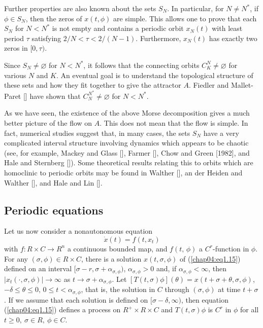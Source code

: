 \documentclass{surv-l}
\theoremstyle{plain}
\theoremstyle{definition}
\numberwithin{equation}{section}
\numberwithin{figure}{chapter}
\begin{document}
Further properties are also known about the sets $S_{N}$. In particular, for $ N\neq N^{\ast}$, if $\phi \in S_{N}$, then the zeros of $x(t, \phi)$ are simple. This allows one to prove that each $S_{N}$ for $N<N^{\ast}$ is not empty and contains a periodic orbit $x_{N}(t)$ with least period $\tau$ satisfying $2/N<\tau<2/(N-1)$. Furthermore, $x_{N}(t)$ has exactly two zeros in $[0, \tau)$.

Since $ S_{N}\neq\varnothing$ for $N<N^{\ast}$, it follows that the connecting orbits $ C_{K}^{N}\neq\varnothing$ for various $N$ and $K$. An eventual goal is to understand the topological structure of these sets and how they fit together to give the attractor $A$. Fiedler and Mallet-Paret [\citeyear{1987fm}] have shown that $ C_{N}^{N^{\ast}}\neq\varnothing$ for $N<{N^{\ast}}$.

As we have seen, the existence of the above Morse decomposition gives a much better picture of the flow on $A$. This does not mean that the flow is simple. In fact, numerical studies suggest that, in many cases, the sets $S_{N}$ have a very complicated interval structure involving dynamics which appears to be chaotic (see, for example, Mackey and Glass [\citeyear{1977mg}], Farmer [\citeyear{1982f}], Chow and Green [1982], and Hale and Sternberg [\citeyear{1987hs}]). Some theoretical results relating this to orbits which are homoclinic to periodic orbits may be found in Walther [\citeyear{1981w}], an der Heiden and Walther [\citeyear{1983dw}], and Hale and Lin [\citeyear{1986hl}].

\subsection{Periodic equations}\label{subsec4.1.6} Let us now consider a nonautonomous equation
\begin{equation}\label{chap04:eq1.15}
\dot{x}(t)=f(t, x_{t})
\end{equation}
with $f\!:R\times C\rightarrow R^{n}$ a continuous bounded map, and $f(t,\,\phi)$ a $C^{r}$-function in $\phi$. For any $(\sigma, \phi)\in R\times C$, there is a solution $x(t, \sigma, \phi)$ of (\ref{chap04:eq1.15}) defined on an interval $[\sigma-r, \sigma+\alpha_{\sigma,\phi})$, $\alpha_{\sigma,\phi}>0$ and, if $\alpha_{\sigma,\phi}<\infty$, then $|x_{t}(\cdot, \sigma, \phi)|\rightarrow\infty$ as $t\rightarrow\sigma+\alpha_{\sigma,\phi}$. Let $[T(t, \sigma)\phi](\theta)=x(t+\sigma+\theta, \sigma, \phi)$, $-\delta\leq\theta\leq 0,\,0\leq t<\alpha_{\sigma,\phi}$, that is, the solution in $C$ through $(\sigma, \phi)$ at time $ t+\sigma$. If we assume that each solution is defined on $[\sigma-\delta, \infty)$, then equation (\ref{chap04:eq1.15}) defines a process on $R^{+}\times R\times C$ and $ T(t, \sigma)\phi$ is $C^{r}$ in $\phi$ for all $t\geq 0,\ \sigma\in R,\ \phi \in C$.
\end{document}
